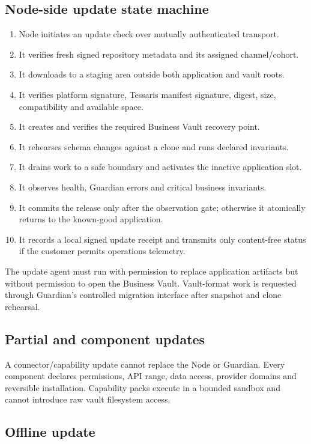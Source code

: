 \documentclass[11pt]{article}
\begin{document}
\subsection{Node-side update state machine}

\begin{enumerate}
  \item Node initiates an update check over mutually authenticated transport.
  \item It verifies fresh signed repository metadata and its assigned channel/cohort.
  \item It downloads to a staging area outside both application and vault roots.
  \item It verifies platform signature, Tessaris manifest signature, digest, size, compatibility and available space.
  \item It creates and verifies the required Business Vault recovery point.
  \item It rehearses schema changes against a clone and runs declared invariants.
  \item It drains work to a safe boundary and activates the inactive application slot.
  \item It observes health, Guardian errors and critical business invariants.
  \item It commits the release only after the observation gate; otherwise it atomically returns to the known-good application.
  \item It records a local signed update receipt and transmits only content-free status if the customer permits operations telemetry.
\end{enumerate}

The update agent must run with permission to replace application artifacts but without permission to open the Business Vault. Vault-format work is requested through Guardian's controlled migration interface after snapshot and clone rehearsal.

\subsection{Partial and component updates}

A connector/capability update cannot replace the Node or Guardian. Every component declares permissions, API range, data access, provider domains and reversible installation. Capability packs execute in a bounded sandbox and cannot introduce raw vault filesystem access.

\subsection{Offline update}
\end{document}
